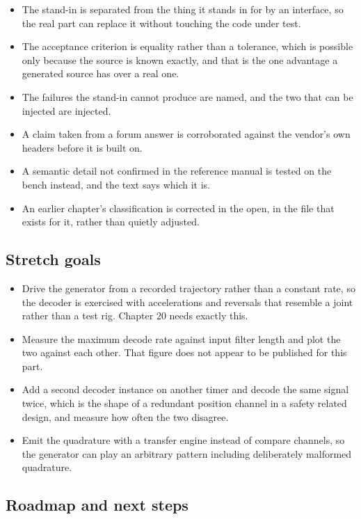 \begin{itemize}
\item The stand-in is separated from the thing it stands in for by an interface,
so the real part can replace it without touching the code under test.
\item The acceptance criterion is equality rather than a tolerance, which is
possible only because the source is known exactly, and that is the one advantage
a generated source has over a real one.
\item The failures the stand-in cannot produce are named, and the two that can
be injected are injected.
\item A claim taken from a forum answer is corroborated against the vendor's own
headers before it is built on.
\item A semantic detail not confirmed in the reference manual is tested on the
bench instead, and the text says which it is.
\item An earlier chapter's classification is corrected in the open, in the file
that exists for it, rather than quietly adjusted.
\end{itemize}

\subsection*{Stretch goals}

\begin{itemize}
\item Drive the generator from a recorded trajectory rather than a constant
rate, so the decoder is exercised with accelerations and reversals that resemble
a joint rather than a test rig. Chapter 20 needs exactly this.
\item Measure the maximum decode rate against input filter length and plot the
two against each other. That figure does not appear to be published for this
part.
\item Add a second decoder instance on another timer and decode the same signal
twice, which is the shape of a redundant position channel in a safety related
design, and measure how often the two disagree.
\item Emit the quadrature with a transfer engine instead of compare channels, so
the generator can play an arbitrary pattern including deliberately malformed
quadrature.
\end{itemize}

\subsection*{Roadmap and next steps}

